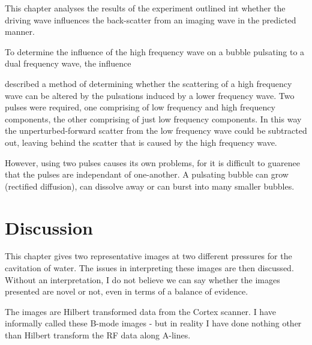This chapter analyses the results of the experiment outlined int  whether the driving  wave influences the back-scatter from an imaging wave in the predicted manner.


To determine the influence of the high frequency wave 
on a bubble pulsating to a dual frequency wave,
the influence 

 described a method of determining whether the scattering of a high frequency wave
can be altered by the pulsations induced by  a lower frequency wave.
Two pulses were required, 
one comprising of low frequency and high frequency components,
the other comprising of just low frequency components.
In this way the unperturbed-forward scatter from the low frequency wave could be subtracted out, 
leaving behind the scatter that is caused by the high frequency wave.

However, using two pulses causes its own problems,
for it is difficult to guarenee that the pulses are independant of one-another.
A pulsating bubble can grow (rectified diffusion),
can dissolve away or can burst into many smaller bubbles. 










\section{Discussion} \label{sec:WE:discussion}




This chapter gives two representative images at two different pressures for the cavitation of water.
The issues in interpreting these images are then discussed.
Without an interpretation, I do not believe we can say whether the images presented are novel or not, 
even in terms of a balance of evidence.

The images are Hilbert transformed data from the Cortex scanner.
I have informally called these B-mode images - but in reality I have done nothing other than  Hilbert transform the RF data along A-lines.


